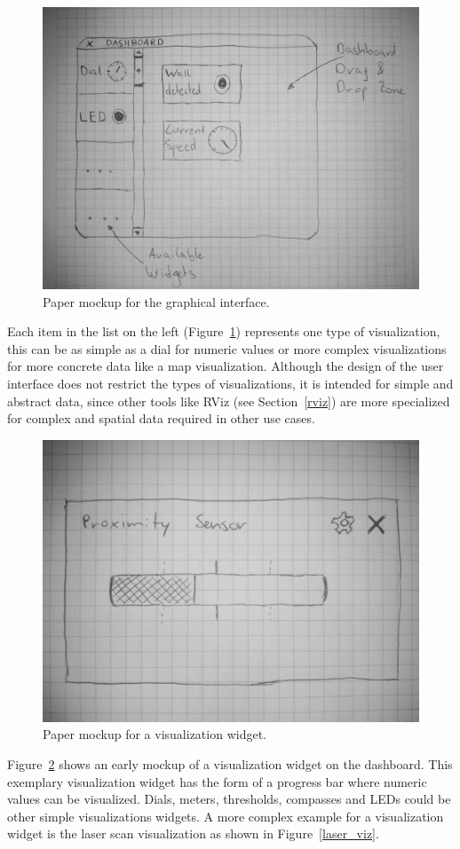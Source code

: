 \begin{figure}[htbp]
  \centering
  \includegraphics[width=\textwidth]{img/initial_gui_mockup.jpg}
  \caption{Paper mockup for the graphical interface.}
  \label{gui_mockup}
\end{figure}

Each item in the list on the left (Figure~\ref{gui_mockup}) represents one type of visualization, this can be as simple as a dial for numeric values or more complex visualizations for more concrete data like a map visualization. Although the design of the user interface does not restrict the types of visualizations, it is intended for simple and abstract data, since other tools like RViz (see Section~\ref{rviz}) are more specialized for complex and spatial data required in other use cases.

\begin{figure}[htbp]
  \centering
  \includegraphics[width=.5\textwidth]{img/initial_widget_mockup.jpg}
  \caption{Paper mockup for a visualization widget.}
  \label{widget_mockup}
\end{figure}

Figure~\ref{widget_mockup} shows an early mockup of a visualization widget on the dashboard. This exemplary visualization widget has the form of a progress bar where numeric values can be visualized. Dials, meters, thresholds, compasses and LEDs could be other simple visualizations widgets. A more complex example for a visualization widget is the laser scan visualization as shown in Figure~\ref{laser_viz}.

